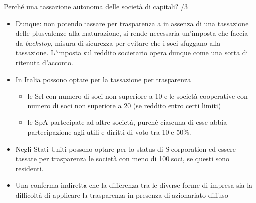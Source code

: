 \documentclass[11pt,italian]{beamer}
\begin{document}
\begin{frame}{Perché una tassazione autonoma delle società di capitali? /3}
\begin{itemize}
\item Dunque: non potendo tassare per trasparenza a in assenza di una tassazione
delle plusvalenze alla maturazione, si rende necessaria un'imposta che
faccia da \emph{backstop}, misura di sicurezza per evitare che i soci sfuggano
alla tassazione. L'imposta sul reddito societario opera dunque come una
sorta di ritenuta d'acconto.
\end{itemize}
\bigskip

\begin{itemize}
\item In Italia possono optare per la tassazione per trasparenza
\begin{itemize}
\item le Srl con numero di soci non superiore a 10 e le società cooperative con
numero di soci non superiore a 20 (se reddito entro certi limiti)
\item le SpA partecipate ad altre società, purché ciascuna di esse abbia
partecipazione agli utili e diritti di voto tra 10 e 50\%.
\end{itemize}
\item Negli Stati Uniti possono optare per lo status di S-corporation ed essere
tassate per trasparenza le società con meno di 100 soci, se questi sono
residenti.
\item Una conferma indiretta che la differenza tra le diverse forme di impresa sia
la difficoltà di applicare la trasparenza in presenza di azionariato
diffuso
\end{itemize}
\end{frame}
\end{document}
